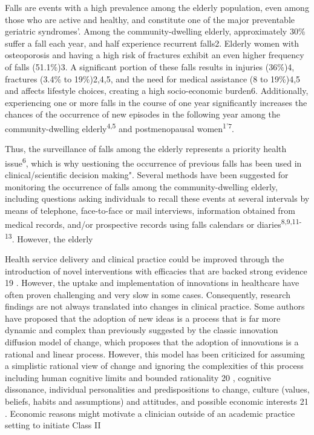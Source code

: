 \begin{multicols}{2}
\par{}Falls are events with a high prevalence among the elderly population, even among those who are active and healthy, and constitute one of the major preventable geriatric syndromes'. Among the community-dwelling elderly, approximately 30\% suffer a fall each year, and half experience recurrent falls2. Elderly women with osteoporosis and having a high risk of fractures exhibit an even higher frequency of falls (51.1\%)3. A significant portion of these falls results in injuries (36\%)4, fractures (3.4\% to 19\%)2,4,5, and the need for medical assistance (8 to 19\%)4,5 and affects lifestyle choices, creating a high socio-economic burden6. Additionally, experiencing one or more falls in the course of one year significantly increases the chances of the occurrence of new episodes in the following year among the community-dwelling elderly\textsuperscript{4,5} and postmenopausal women\textsuperscript{1'7}.
\par{}Thus, the surveillance of falls among the elderly represents a priority health issue\textsuperscript{6},  which is why uestioning the occurrence of previous falls has been used in clinical/scientific decision making". Several methods have been suggested for monitoring the occurrence of falls among the community-dwelling elderly, including questions asking individuals to recall these events at several intervals by means of telephone, face-to-face or mail interviews, information obtained from medical records, and/or prospective records using falls calendars or diaries\textsuperscript{8,9,11-13}. However, the elderly
\par{}Health service delivery and clinical practice could be improved
through the introduction of novel interventions with efficacies that are
backed strong evidence 19 . However, the uptake and implementation
of innovations in healthcare have often proven challenging and
very slow in some cases. Consequently, research findings are not
always translated into changes in clinical practice. Some authors
have proposed that the adoption of new ideas is a process that is
far more dynamic and complex than previously suggested by the
classic innovation diffusion model of change, which proposes
that the adoption of innovations is a rational and linear process.
However, this model has been criticized for assuming a simplistic
rational view of change and ignoring the complexities of this process
including human cognitive limits and bounded rationality 20 , cognitive
dissonance, individual personalities and predispositions to change,
culture (values, beliefs, habits and assumptions) and attitudes, and
possible economic interests 21 . Economic reasons might motivate a
clinician outside of an academic practice setting to initiate Class II



\end{multicols}
